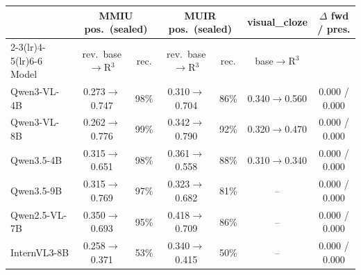 \begin{tabular}{lcccccc}
\toprule
 & \multicolumn{2}{c}{MMIU pos.\ (sealed)} & \multicolumn{2}{c}{MUIR pos.\ (sealed)} & visual\_cloze & $\Delta$ fwd / pres. \\
\cmidrule(lr){2-3}\cmidrule(lr){4-5}\cmidrule(lr){6-6}
Model & rev.\ base$\to$R$^3$ & rec. & rev.\ base$\to$R$^3$ & rec. & base$\to$R$^3$ & \\
\midrule
Qwen3-VL-4B & 0.273$\to$0.747 & 98\% & 0.310$\to$0.704 & 86\% & 0.340$\to$0.560 & 0.000 / 0.000 \\
Qwen3-VL-8B & 0.262$\to$0.776 & 99\% & 0.342$\to$0.790 & 92\% & 0.320$\to$0.470 & 0.000 / 0.000 \\
Qwen3.5-4B & 0.315$\to$0.651 & 98\% & 0.361$\to$0.558 & 88\% & 0.310$\to$0.340 & 0.000 / 0.000 \\
Qwen3.5-9B & 0.315$\to$0.769 & 97\% & 0.323$\to$0.682 & 81\% & -- & 0.000 / 0.000 \\
Qwen2.5-VL-7B & 0.350$\to$0.693 & 95\% & 0.418$\to$0.709 & 86\% & -- & 0.000 / 0.000 \\
InternVL3-8B & 0.258$\to$0.371 & 53\% & 0.340$\to$0.415 & 50\% & -- & 0.000 / 0.000 \\
\bottomrule
\end{tabular}
